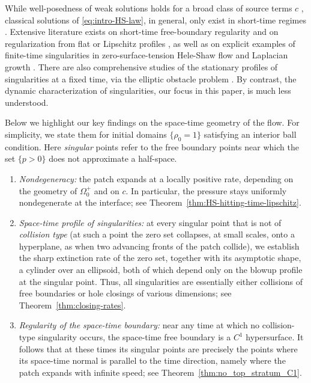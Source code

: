 \documentclass[11pt]{amsart}
\numberwithin{equation}{section}
\numberwithin{figure}{section}
\theoremstyle{plain}
\theoremstyle{definition}
\theoremstyle{remark}
\theoremstyle{plain}
\begin{document}
  While well-posedness of weak solutions holds for a broad class of source terms $c$ \cite{PQV14,MPQ17,JKT21,GKM22,DavidPerthame}, classical solutions of \eqref{eq:intro-HS-law}, in general, only exist in short-time regimes \cite{EscherSimonett97,PruSim16}. Extensive literature exists on short-time free-boundary regularity and on regularization from flat or Lipschitz profiles \cite{Kim06,CJK07,CJK09,ChangLaraGuillen16,kimZhang24,Liang26}, as well as on explicit examples of finite-time singularities in zero-surface-tension Hele-Shaw flow and Laplacian growth \cite{Howison86,LeeTeodorescuWiegmann09}. There are also comprehensive studies of the stationary profiles of singularities at a fixed time, via the elliptic obstacle problem \cite{Caffarelli98,Monneau03,FS18,FRS20,EFW25}.  By contrast, the dynamic characterization of singularities, our focus in this paper, is much less understood.

  
Below we highlight our key findings on the space-time geometry of the flow. For simplicity, we state them for initial domains $\{\rho_0=1\}$ satisfying an interior ball condition. Here {\it singular} points refer to the free boundary points near which the set $\{p>0\}$ does not approximate a half-space.
  \begin{enumerate}[label=(\alph*)]
      \item\label{i:result-nondegeneracy} {\it Nondegeneracy:} the patch expands at a locally positive rate, depending on the geometry of $\Omega_0^+$ and on $c$. In particular, the pressure stays uniformly nondegenerate at the interface; see Theorem~\ref{thm:HS-hitting-time-lipschitz}.
      \item\label{i:result-space-time-profile} {\it Space-time profile of singularities:} at every singular  point that is not of {\it collision type} (at such a point the zero set collapses, at small scales, onto a hyperplane, as when two advancing fronts of the patch collide), we establish the sharp extinction rate of the zero set, together with its asymptotic shape, a cylinder over an ellipsoid, both of which depend only on the blowup profile at the singular point. Thus, all singularities are essentially either collisions of free boundaries or hole closings of various dimensions; see Theorem~\ref{thm:closing-rates}.
      \item\label{i:result-space-time-regularity} {\it Regularity of the space-time boundary:} near any time at which no collision-type singularity occurs, the space-time free boundary is a $C^1$ hypersurface. It follows that  at these times its singular points are precisely the points where its space-time normal is parallel to the time direction, namely where the patch expands with infinite speed; see Theorem~\ref{thm:no_top_stratum_C1}.
 \end{enumerate}
\end{document}
